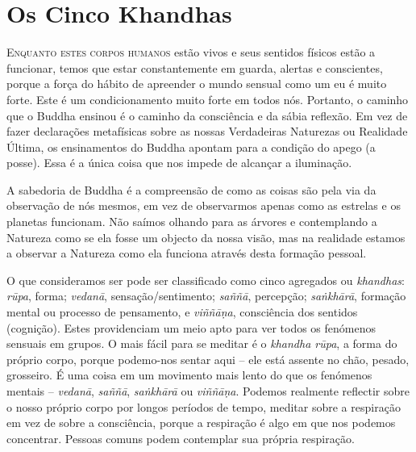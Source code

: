 \chapter{Os Cinco Khandhas}

\lettrine{E}{nquanto estes corpos humanos} estão vivos e seus sentidos físicos estão a
funcionar, temos que estar constantemente em guarda, alertas e conscientes,
porque a força do hábito de apreender o mundo sensual como um eu é muito forte.
Este é um condicionamento muito forte em todos nós. Portanto, o caminho que o
Buddha ensinou é o caminho da consciência e da sábia reflexão. Em vez de fazer
declarações metafísicas sobre as nossas Verdadeiras Naturezas ou Realidade
Última, os ensinamentos do Buddha apontam para a condição do apego (a posse).
Essa é a única coisa que nos impede de alcançar a iluminação.

A sabedoria de Buddha é a compreensão de como as coisas são pela via da
observação de nós mesmos, em vez de observarmos apenas como as estrelas e os
planetas funcionam. Não saímos olhando para as árvores e contemplando a Natureza
como se ela fosse um objecto da nossa visão, mas na realidade estamos a observar
a Natureza como ela funciona através desta formação pessoal.

O que consideramos ser pode ser classificado como cinco agregados ou
\emph{khandhas}: \emph{rūpa}, forma; \emph{vedanā}, sensação/sentimento;
\emph{saññā}, percepção; \emph{saṅkhārā}, formação mental ou processo de pensamento, e
\emph{viññāṇa}, consciência dos sentidos (cognição). Estes providenciam um meio
apto para ver todos os fenómenos sensuais em grupos. O mais fácil para se
meditar é o \emph{khandha rūpa}, a forma do próprio corpo, porque podemo-nos
sentar aqui -- ele está assente no chão, pesado, grosseiro. É uma coisa em um
movimento mais lento do que os fenómenos mentais -- \emph{vedanā}, \emph{saññā},
\emph{saṅkhārā} ou \emph{viññāṇa}. Podemos realmente reflectir sobre o nosso
próprio corpo por longos períodos de tempo, meditar sobre a respiração em vez de
sobre a consciência, porque a respiração é algo em que nos podemos concentrar.
Pessoas comuns podem contemplar sua própria respiração.


